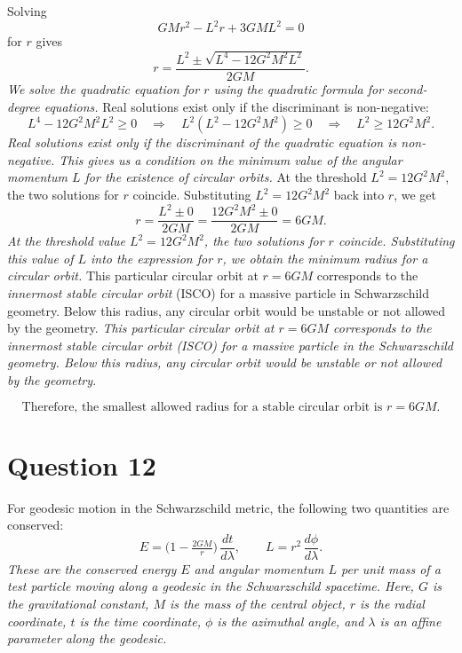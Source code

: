 \documentclass{article}
\begin{document}
Solving
\begin{equation*}
GM r^2 - L^2 r + 3 G M L^2 = 0
\end{equation*}
for $r$ gives
\begin{equation*}
r = \frac{L^2 \pm \sqrt{L^4 - 12 G^2 M^2 L^2}}{2 G M}.
\end{equation*}
\textit{We solve the quadratic equation for $r$ using the quadratic formula for second-degree equations.}
Real solutions exist only if the discriminant is non-negative:
\begin{equation*}
L^4 - 12 G^2 M^2 L^2 \ge 0
\quad \Longrightarrow \quad
L^2 \left(L^2 - 12 G^2 M^2\right) \ge 0
\quad \Longrightarrow \quad
L^2 \ge 12 G^2 M^2.
\end{equation*}
\textit{Real solutions exist only if the discriminant of the quadratic equation is non-negative. This gives us a condition on the minimum value of the angular momentum $L$ for the existence of circular orbits.}
At the threshold $L^2 = 12 G^2 M^2$, the two solutions for $r$ coincide. Substituting $L^2 = 12 G^2 M^2$ back into $r$, we get
\begin{equation*}
r = \frac{L^2 \pm 0}{2 G M} = \frac{12 G^2 M^2 \pm 0}{2 G M} = 6 G M.
\end{equation*}
\textit{At the threshold value $L^2 = 12 G^2 M^2$, the two solutions for $r$ coincide. Substituting this value of $L$ into the expression for $r$, we obtain the minimum radius for a circular orbit.}
This particular circular orbit at $r = 6 G M$ corresponds to the \emph{innermost stable circular orbit} (ISCO) for a massive particle in Schwarzschild geometry. Below this radius, any circular orbit would be unstable or not allowed by the geometry.
\textit{This particular circular orbit at $r = 6 G M$ corresponds to the innermost stable circular orbit (ISCO) for a massive particle in the Schwarzschild geometry. Below this radius, any circular orbit would be unstable or not allowed by the geometry.}


\[
\boxed{
\text{Therefore, the smallest allowed radius for a stable circular orbit is } r = 6 G M.
}
\]

\section*{Question 12}
For geodesic motion in the Schwarzschild metric, the following two quantities are conserved:
\[
E = \bigl(1 - \tfrac{2 G M}{r}\bigr)\,\frac{dt}{d\lambda},
\qquad
L = r^{2}\,\frac{d\phi}{d\lambda}.
\]
\textit{These are the conserved energy $E$ and angular momentum $L$ per unit mass of a test particle moving along a geodesic in the Schwarzschild spacetime. Here, $G$ is the gravitational constant, $M$ is the mass of the central object, $r$ is the radial coordinate, $t$ is the time coordinate, $\phi$ is the azimuthal angle, and $\lambda$ is an affine parameter along the geodesic.}
\end{document}
